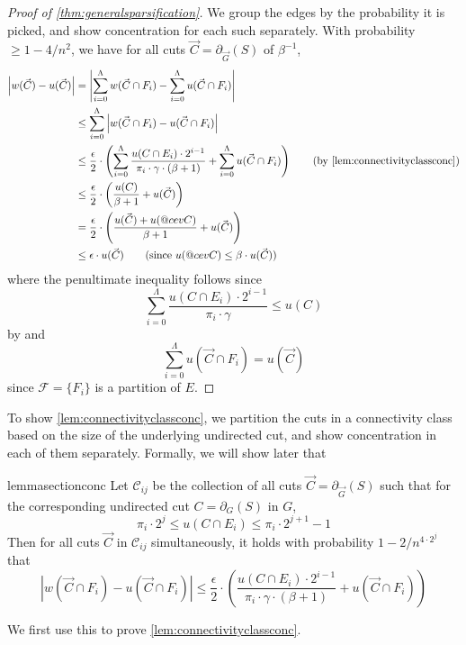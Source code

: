 \documentclass[11pt,a4paper]{article}
\makeatletter
\newcommand{\abs}[1]{\ensuremath{\left| #1 \right|}}
\newcommand{\eps}{\epsilon}
\newcommand{\bound}{\abs{w(\vec{C} \cap F_i) - u(\vec{C} \cap F_i)} \le \frac{\eps}{2} \cdot \left( \frac{u(C \cap E_i) \cdot 2^{i-1}}{\pi_i \cdot \gamma \cdot (\beta+1)} + u(\vec{C} \cap F_i) \right)}
\DeclareRobustCommand{\cev}[1]{{\mathpalette\do@cev{#1}}}
\newcommand{\do@cev}[2]{\vbox{\offinterlineskip
    \sbox\z@{$\m@th#1 x$}\ialign{##\cr
      \hidewidth\reflectbox{$\m@th#1\vec{}\mkern4mu$}\hidewidth\cr
      \noalign{\kern-\ht\z@}
      $\m@th#1#2$\cr
    }}}
\makeatother
\begin{document}
\begin{proof}[Proof of \cref{thm:generalsparsification}]
We group the edges by the probability it is picked, and show concentration for each such \connectivityclass separately.
With probability $\ge 1 - 4/n^2$, we have for all cuts $\vec{C} = \partial_{\vec{G}}(S)$ of \balance $\beta^{-1}$,
\begin{align*}
\abs{w(\vec{C}) - u(\vec{C})}
&= \abs{\sum_{i = 0}^\Lambda w(\vec{C} \cap F_i) - \sum_{i=0}^\Lambda u(\vec{C} \cap F_i)} \\
&\le \sum_{i = 0}^\Lambda  \abs{w(\vec{C} \cap F_i) - u(\vec{C} \cap F_i)} \\
&\le \frac{\eps}{2} \cdot \left( \sum_{i=0}^\Lambda \frac{u(C \cap E_i) \cdot 2^{i-1}}{\pi_i \cdot \gamma \cdot (\beta+1)} + \sum_{i=0}^\Lambda u(\vec{C} \cap F_i) \right) \tag*{(by \cref{lem:connectivityclassconc})} \\
&\le \frac{\eps}{2} \cdot \left( \frac{u(C)}{\beta+1} + u(\vec{C}) \right) \\
&= \frac{\eps}{2} \cdot \left( \frac{u(\vec{C}) + u(\cev{C})}{\beta+1} + u(\vec{C}) \right) \\
&\le \eps \cdot u(\vec{C}) \tag*{(since $u(\cev{C}) \le \beta \cdot u(\vec{C})$)}
\end{align*}
where the penultimate inequality follows since
\[
\sum_{i=0}^\Lambda \frac{u(C \cap E_i) \cdot 2^{i-1}}{\pi_i \cdot \gamma} \le u(C)
\] by \gammaoverlap and
\[
\sum_{i=0}^\Lambda u(\vec{C} \cap F_i) = u(\vec{C})
\] since $\mathcal F = \{ F_i \}$ is a partition of $E$.
\end{proof}

To show \cref{lem:connectivityclassconc}, we partition the cuts in a connectivity class based on the size of the underlying undirected cut, and show concentration in each of them separately. Formally, we will show later that
\begin{restatable}{lemma}{sectionconc}
\label{lem:sectionconc}
Let $\mathcal C_{ij}$ be the collection of all cuts $\vec{C} = \partial_{\vec{G}}(S)$ such that for the corresponding undirected cut $C = \partial_G(S)$ in $G$,
\[
\pi_i \cdot 2^j \le u(C \cap E_i) \le \pi_i \cdot 2^{j+1} - 1
\]
Then for all cuts $\vec{C}$ in $\mathcal C_{ij}$ simultaneously, it holds with probability $1 - 2/n^{4 \cdot 2^j}$ that
\[
\bound
\]
\end{restatable}

We first use this to prove \cref{lem:connectivityclassconc}.

\connectivityclassconc*
\end{document}
